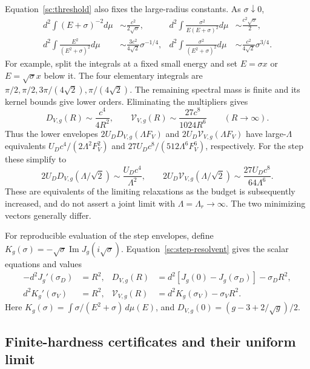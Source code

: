 \documentclass[aps,prl,reprint,superscriptaddress,longbibliography]{revtex4-2}
\begin{document}
Equation~\eqref{sc:threshold} also fixes the large-radius constants.
As $\sigma\downarrow0$,
\begin{align}
 d^2\int(E+\sigma)^{-2}d\mu&\sim\frac{c^2}{2\sqrt\sigma},&
 d^2\int\frac{\sigma^2}{E(E+\sigma)^2}d\mu&\sim\frac{c^2\sqrt\sigma}{2},\\
 d^2\int\frac{E^2}{(E^2+\sigma)^2}d\mu&\sim
 \frac{3c^2}{4\sqrt2}\sigma^{-1/4},&
 d^2\int\frac{\sigma^2}{(E^2+\sigma)^2}d\mu&\sim
 \frac{c^2}{4\sqrt2}\sigma^{3/4}.
 \label{sc:small-multiplier}
\end{align}
For example, split the integrals at a fixed small energy and set
$E=\sigma x$ or $E=\sqrt\sigma x$ below it. The four elementary
integrals are $\pi/2,\pi/2,3\pi/(4\sqrt2),\pi/(4\sqrt2)$.
The remaining spectral mass is finite and its kernel bounds give lower
orders. Eliminating the multipliers gives
\begin{equation}
 D_{V,g}(R)\sim\frac{c^4}{4R^2},\qquad
 \mathcal V_{V,g}(R)\sim\frac{27c^8}{1024R^6}
 \qquad(R\to\infty).
 \label{sc:large-radius}
\end{equation}
Thus the lower envelopes $2U_DD_{V,g}(\Lambda F_V)$ and
$2U_D\mathcal V_{V,g}(\Lambda F_V)$ have large-$\Lambda$ equivalents
$U_Dc^4/(2\Lambda^2F_V^2)$ and
$27U_Dc^8/(512\Lambda^6F_V^6)$, respectively. For the step these simplify to
\begin{equation}
 2U_DD_{V,g}(\Lambda/\sqrt2)\sim\frac{U_Dc^4}{\Lambda^2},\qquad
 2U_D\mathcal V_{V,g}(\Lambda/\sqrt2)
 \sim\frac{27U_Dc^8}{64\Lambda^6}.
 \label{sc:step-action-asymptotics}
\end{equation}
These are equivalents of the limiting relaxations as the budget is
subsequently increased, and do not assert a joint limit with
$\Lambda=\Lambda_r\to\infty$. The two minimizing vectors generally differ.

For reproducible evaluation of the step envelopes, define
$K_g(\sigma)=-\sqrt\sigma\operatorname{Im}J_g(i\sqrt\sigma)$.
Equation~\eqref{sc:step-resolvent} gives the scalar equations and values
\begin{align}
 -d^2J_g'(\sigma_D)&=R^2,&
 D_{V,g}(R)&=d^2[J_g(0)-J_g(\sigma_D)]-\sigma_DR^2,\\
 d^2K_g'(\sigma_V)&=R^2,&
 \mathcal V_{V,g}(R)&=d^2K_g(\sigma_V)-\sigma_VR^2.
 \label{sc:numerical-formulas}
\end{align}
Here $K_g(\sigma)=\int\sigma/(E^2+\sigma)\,d\mu(E)$, and
$D_{V,g}(0)=(g-3+2/\sqrt g)/2$.

\subsection{Finite-hardness certificates and their uniform limit}
\label{sc:certificates}
\end{document}
